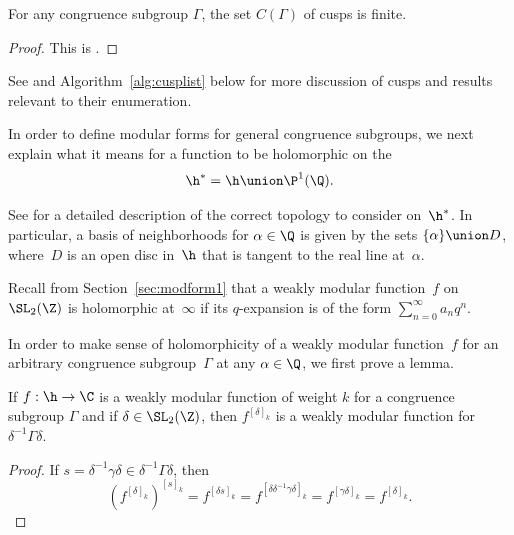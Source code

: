 \begin{proposition}\label{prop:cuspfinite}
  For any congruence subgroup $\Gamma$, the set $C(\Gamma)$ of cusps
  is finite.
\end{proposition}
\begin{proof}
  This is .
\end{proof}
See \cite[\S3.8]{diamond-shurman} and Algorithm~\ref{alg:cusplist} below for more discussion
of cusps and results relevant to their enumeration.

In order to define modular forms for general congruence subgroups, we
next explain what it means for a function to be holomorphic
on the 
$$
  \h^* = \h\union \P^1(\Q).
$$\index{$\h^*$}

See \cite[\S1.3--1.5]{shimura:intro} for a detailed description of the
correct topology to consider on~$\h^*$.  In particular, a basis of
neighborhoods for $\alpha\in\Q$ is given by the sets $\{\alpha\}\union
D$, where~$D$ is an open disc in~$\h$ that is tangent to the real line
at~$\alpha$.

Recall from Section~\ref{sec:modform1} that a weakly modular
function~$f$ on $\SL_2(\Z)$ is holomorphic at~$\infty$ if its
$q$-expansion is of the form $\sum_{n=0}^{\infty} a_n q^n$.

In order to make sense of holomorphicity of a weakly modular
function~$f$ for an arbitrary congruence subgroup~$\Gamma$ at any
$\alpha\in\Q$, we first prove a lemma.
\begin{lemma}
If $f :\h\to\C$ is a weakly modular function of weight $k$
for a congruence subgroup $\Gamma$ and if $\delta \in \SL_2(\Z)$,
then $f^{[\delta]_k}$ is a weakly modular function for
$\delta^{-1}\Gamma \delta$.
\end{lemma}
\begin{proof}
If $s = \delta^{-1} \gamma\delta \in \delta^{-1}\Gamma \delta$,
then 
$$ 
   (f^{[\delta]_k})^{[s]_k} = f^{[\delta s]_k}
          = f^{[\delta \delta^{-1}\gamma\delta]_k}
          = f^{[\gamma\delta]_k} = f^{[\delta]_k}.
$$
\end{proof}

